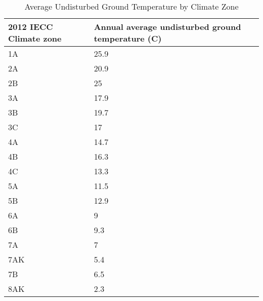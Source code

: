 \begin{table}[]
    \centering
    \caption[Average Undisturbed Ground Temperature by Climate Zone]{Average Undisturbed Ground Temperature by Climate Zone}
    \label{tab:undisturbed_ground_temp}
    \begin{tabular}{|l|l|}
    \hline
    2012 IECC Climate zone & Annual average undisturbed ground temperature (C) \\ \hline
    1A                     & 25.9                                              \\ \hline
    2A                     & 20.9                                              \\ \hline
    2B                     & 25                                                \\ \hline
    3A                     & 17.9                                              \\ \hline
    3B                     & 19.7                                              \\ \hline
    3C                     & 17                                                \\ \hline
    4A                     & 14.7                                              \\ \hline
    4B                     & 16.3                                              \\ \hline
    4C                     & 13.3                                              \\ \hline
    5A                     & 11.5                                              \\ \hline
    5B                     & 12.9                                              \\ \hline
    6A                     & 9                                                 \\ \hline
    6B                     & 9.3                                               \\ \hline
    7A                     & 7                                                 \\ \hline
    7AK                    & 5.4                                               \\ \hline
    7B                     & 6.5                                               \\ \hline
    8AK                    & 2.3                                               \\ \hline
    \end{tabular}%
\end{table}
